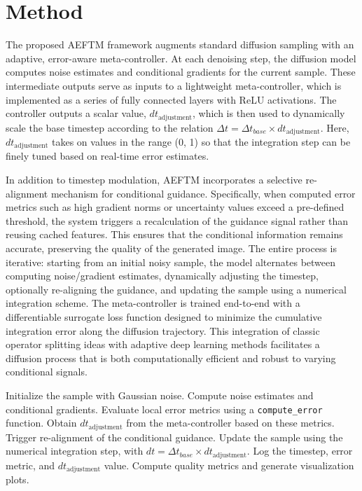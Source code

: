 \documentclass{article} %
\begin{document}
\section{Method}
\label{sec:method}
The proposed AEFTM framework augments standard diffusion sampling with an adaptive, error-aware meta-controller. At each denoising step, the diffusion model computes noise estimates and conditional gradients for the current sample. These intermediate outputs serve as inputs to a lightweight meta-controller, which is implemented as a series of fully connected layers with ReLU activations. The controller outputs a scalar value, $dt_\text{adjustment}$, which is then used to dynamically scale the base timestep according to the relation $\Delta t = \Delta t_{base} \times dt_\text{adjustment}$. Here, $dt_\text{adjustment}$ takes on values in the range (0, 1) so that the integration step can be finely tuned based on real-time error estimates.

In addition to timestep modulation, AEFTM incorporates a selective re-alignment mechanism for conditional guidance. Specifically, when computed error metrics such as high gradient norms or uncertainty values exceed a pre-defined threshold, the system triggers a recalculation of the guidance signal rather than reusing cached features. This ensures that the conditional information remains accurate, preserving the quality of the generated image. The entire process is iterative: starting from an initial noisy sample, the model alternates between computing noise/gradient estimates, dynamically adjusting the timestep, optionally re-aligning the guidance, and updating the sample using a numerical integration scheme. The meta-controller is trained end-to-end with a differentiable surrogate loss function designed to minimize the cumulative integration error along the diffusion trajectory. This integration of classic operator splitting ideas with adaptive deep learning methods facilitates a diffusion process that is both computationally efficient and robust to varying conditional signals.

\begin{algorithm}[H]
\begin{algorithmic}
  \State Initialize the sample with Gaussian noise.
    \State Compute noise estimates and conditional gradients.
    \State Evaluate local error metrics using a \texttt{compute\_error} function.
    \State Obtain $dt_\text{adjustment}$ from the meta-controller based on these metrics.
      \State Trigger re-alignment of the conditional guidance.
    \EndIf
    \State Update the sample using the numerical integration step, with $dt = \Delta t_{base} \times dt_\text{adjustment}$.
    \State Log the timestep, error metric, and $dt_\text{adjustment}$ value.
  \EndFor
  \State Compute quality metrics and generate visualization plots.
\end{algorithmic}
\end{algorithm}
\end{document}
